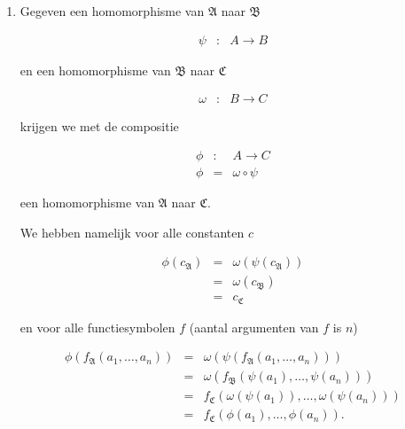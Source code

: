 \documentclass[a4paper,11pt]{article}
\begin{document}
\begin{enumerate}

\item %

Gegeven een homomorphisme van $\mathfrak{A}$ naar $\mathfrak{B}$

\begin{eqnarray*}
\psi & : & A \rightarrow B
\end{eqnarray*}

en een homomorphisme van $\mathfrak{B}$ naar $\mathfrak{C}$

\begin{eqnarray*}
\omega & : & B \rightarrow C
\end{eqnarray*}

krijgen we met de compositie

\begin{eqnarray*}
\phi & : & A \rightarrow C \\
\phi & = & \omega \circ \psi
\end{eqnarray*}

een homomorphisme van $\mathfrak{A}$ naar $\mathfrak{C}$.

We hebben namelijk voor alle constanten $c$

\begin{eqnarray*}
\phi(c_{\mathfrak{A}}) & = & \omega(\psi(c_{\mathfrak{A}})) \\
                       & = & \omega(c_{\mathfrak{B}}) \\
                       & = & c_{\mathfrak{C}}
\end{eqnarray*}

en voor alle functiesymbolen $f$ (aantal argumenten van $f$ is $n$)

\begin{eqnarray*}
\phi(f_{\mathfrak{A}}(a_{1}, \ldots, a_{n})) & = &
                                             \omega(\psi(f_{\mathfrak{A}}(a_{1},
                                             \ldots, a_{n}))) \\
                                             & = &
                                             \omega(f_{\mathfrak{B}}(\psi(a_{1}),
                                             \ldots, \psi(a_{n}))) \\
                                             & = &
                                             f_{\mathfrak{C}}(\omega(\psi(a_{1})),
                                             \ldots, \omega(\psi(a_{n}))) \\
                                             & = &
                                             f_{\mathfrak{C}}(\phi(a_{1}),
                                             \ldots, \phi(a_{n})).
\end{eqnarray*}


\end{enumerate}
\end{document}
